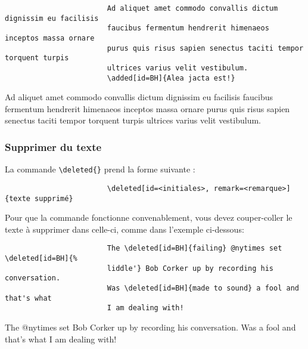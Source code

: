 \documentclass[french]{article}
\newcommand{\cmd}[1]{%
	\texttt{\textbackslash#1\{\}}
}
\begin{document}
				\begin{shaded*}
					\begin{verbatim}
						Ad aliquet amet commodo convallis dictum dignissim eu facilisis 
						faucibus fermentum hendrerit himenaeos inceptos massa ornare 
						purus quis risus sapien senectus taciti tempor torquent turpis 
						ultrices varius velit vestibulum.
						\added[id=BH]{Alea jacta est!}
					\end{verbatim}
				\end{shaded*}
			
				\begin{leftbar}
					Ad aliquet amet commodo convallis dictum dignissim eu facilisis 
					faucibus fermentum hendrerit himenaeos inceptos massa ornare 
					purus quis risus sapien senectus taciti tempor torquent turpis 
					ultrices varius velit vestibulum.
				\end{leftbar}
			
			\subsubsection{Supprimer du texte}
			
				La commande \cmd{deleted} prend la forme suivante :
				
				\begin{shaded*}
					\begin{verbatim}
						\deleted[id=<initiales>, remark=<remarque>]{texte supprimé}
					\end{verbatim}
				\end{shaded*}
			
				Pour que la commande fonctionne convenablement, vous devez couper-coller le texte à supprimer
				dans celle-ci, comme dans l'exemple ci-dessous:
				
				\begin{shaded*}
					\begin{verbatim}
						The \deleted[id=BH]{failing} @nytimes set \deleted[id=BH]{%
						liddle'} Bob Corker up by recording his conversation. 
						Was \deleted[id=BH]{made to sound} a fool and that's what 
						I am dealing with!
					\end{verbatim}
				\end{shaded*}
			
				\begin{leftbar}
					The  @nytimes set \deleted[id=BH]{liddle'} Bob Corker 
					up by recording his conversation. 
					Was  a fool and that's what 
					I am dealing with!
				\end{leftbar}
			
\end{document}
